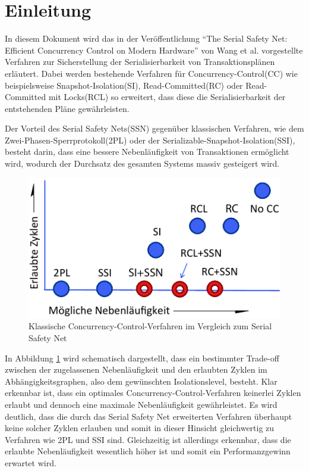 \section{Einleitung}
\label{sec:einleitung}

In diesem Dokument wird das in der Veröffentlichung \enquote{The Serial Safety Net: Efficient Concurrency Control on Modern Hardware} von Wang et al. \cite{Wang:2015} vorgestellte Verfahren zur Sicherstellung der Serialisierbarkeit von Transaktionsplänen erläutert.
Dabei werden bestehende Verfahren für Concurrency-Control(CC) wie beispielsweise Snapshot-Isolation(SI), Read-Committed(RC) oder Read-Committed mit Locks(RCL) so erweitert, dass diese die Serialisierbarkeit der entstehenden Pläne gewährleisten.

Der Vorteil des Serial Safety Nets(SSN) gegenüber klassischen Verfahren, wie dem Zwei-Phasen-Sperrprotokoll(2PL) oder der Serializable-Snapshot-Isolation(SSI), besteht darin, dass eine bessere Nebenläufigkeit von Transaktionen ermöglicht wird, wodurch der Durchsatz des gesamten Systems massiv gesteigert wird.

\begin{figure}
	\includegraphics{img/Figure_1_komplett.pdf}
	\caption{Klassische Concurrency-Control-Verfahren im Vergleich zum Serial Safety Net}
	\label{fig:trade_off}
\end{figure}

In Abbildung \ref{fig:trade_off} wird schematisch dargestellt, dass ein bestimmter Trade-off zwischen der zugelassenen Nebenläufigkeit und den erlaubten Zyklen im Abhängigkeitsgraphen, also dem gewünschten Isolationslevel, besteht.
Klar erkennbar ist, dass ein optimales Concurrency-Control-Verfahren keinerlei Zyklen erlaubt und dennoch eine maximale Nebenläufigkeit gewährleistet.
Es wird deutlich, dass die durch das Serial Safety Net erweiterten Verfahren überhaupt keine solcher Zyklen erlauben und somit in dieser Hinsicht gleichwertig zu Verfahren wie 2PL und SSI sind.
Gleichzeitig ist allerdings erkennbar, dass die erlaubte Nebenläufigkeit wesentlich höher ist und somit ein Performanzgewinn erwartet wird.

